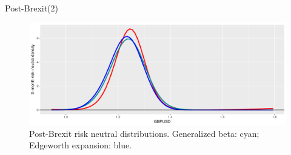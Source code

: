 \begin{frame}{Post-Brexit(2)}

\begin{figure}
\includegraphics[width=1\linewidth]{2018_02_07_IMF_FXCourse_files/figure-beamer/unnamed-chunk-82-1} \caption{Post-Brexit risk neutral distributions. Generalized beta: cyan; Edgeworth expansion: blue.}\label{fig:unnamed-chunk-82}
\end{figure}

\end{frame}
